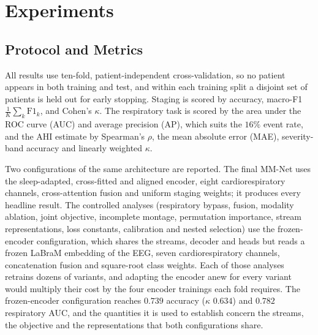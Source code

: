 \documentclass[a4paper,fleqn]{cas-sc}
\newcommand{\fzAcc}{0.739}
\newcommand{\fzK}{0.634}
\newcommand{\fzAuc}{0.782}
\begin{document}
\section{Experiments}
\label{sec:results}
\subsection{Protocol and Metrics}
All results use ten-fold, patient-independent cross-validation, so no patient appears in both
training and test, and within each training split a disjoint set of patients is held out for
early stopping. Staging is scored by accuracy, macro-F1 $\tfrac{1}{K}\sum_k\mathrm{F1}_k$, and
Cohen's $\kappa$. The respiratory task is scored by the area under the ROC curve (AUC) and
average precision (AP), which suits the $16\%$ event rate, and the AHI estimate by Spearman's
$\rho$, the mean absolute error (MAE), severity-band accuracy and linearly weighted $\kappa$.

Two configurations of the same architecture are reported. The final MM-Net uses the
sleep-adapted, cross-fitted and aligned encoder, eight cardiorespiratory channels,
cross-attention fusion and uniform staging weights; it produces every headline result. The
controlled analyses (respiratory bypass, fusion, modality ablation, joint objective, incomplete
montage, permutation importance, stream representations, loss constants,
calibration and nested selection) use the frozen-encoder configuration, which shares the
streams, decoder and heads but reads a frozen LaBraM embedding of the EEG, seven
cardiorespiratory channels, concatenation fusion and square-root class weights. Each of those
analyses retrains dozens of variants, and adapting the encoder anew for every variant would
multiply their cost by the four encoder trainings each fold requires. The frozen-encoder
configuration reaches $\fzAcc$ accuracy ($\kappa$ $\fzK$) and $\fzAuc$ respiratory AUC, and the
quantities it is used to establish concern the streams, the objective and the
representations that both configurations share.
\end{document}
